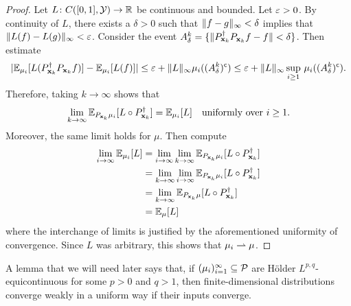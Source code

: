 \documentclass[12pt]{report}
\begin{document}
\begin{proof}
    Let $L\colon C([0, 1], \mathcal{Y}) \to \mathbb{R}$ be continuous and bounded.
    Let $\varepsilon > 0$.
    By continuity of $L$, there exists a $\delta > 0$ such that $\lVert f - g\rVert_\infty < \delta$ implies that $\lVert L(f) - L(g)\rVert_\infty < \varepsilon$.
    Consider the event $A^k_\delta = \{\lVert P_{\mathbf{x}_k}^\dagger P_{\mathbf{x}_k} f - f\rVert < \delta\}$.
    Then estimate
    \begin{equation}
        \abs{
            \E_{\mu_i}[L(P_{\vx_k}^\dagger P_{\vx_k} f)]
            - \E_{\mu_i}[L(f)]
        }
        \le \e + \norm{L}_\infty \mu_i((A^k_\delta)^\c)
        \le \e + \norm{L}_\infty \sup_{i \ge 1} \,\mu_i((A^k_\delta)^\c).
    \end{equation}
    Therefore, taking $k \to \infty$ shows that
    \begin{equation}
        \lim_{k \to \infty} \mathbb{E}_{P_{\mathbf{x}_k} \mu_i}[L \circ P_{\mathbf{x}_k}^\dagger]
        = \mathbb{E}_{\mu_i}[L] \quad \text{uniformly over $i \ge 1$}.
    \end{equation}
    Moreover, the same limit holds for $\mu$.
    Then compute
    \begin{align*}
        \lim_{i \to \infty} \mathbb{E}_{\mu_i}[L]
        &= \lim_{i \to \infty} \lim_{k \to \infty} \mathbb{E}_{P_{\mathbf{x}_k} \mu_i}[L \circ P_{\mathbf{x}_k}^\dagger] \\
        &=  \lim_{k \to \infty} \lim_{i \to \infty} \mathbb{E}_{P_{\mathbf{x}_k}\mu_i}[L \circ P_{\mathbf{x}_k}^\dagger] \\
        &=  \lim_{k \to \infty} \mathbb{E}_{P_{\mathbf{x}_k}\mu}[L \circ P_{\mathbf{x}_k}^\dagger] \\
        &= \mathbb{E}_{\mu}[L]
    \end{align*}
    where the interchange of limits is justified by the aforementioned uniformity of convergence.
    Since $L$ was arbitrary, this shows that $\mu_i \rightharpoonup \mu$.
\end{proof}

A lemma that we will need later says that, if $(\mu_i)_{i=1}^\infty \subseteq \mathcal{P}$ are H\"older $L^{p,q}$-equicontinuous for some $p > 0$ and $q > 1$, then finite-dimensional distributions converge weakly in a uniform way if their inputs converge.
\end{document}
